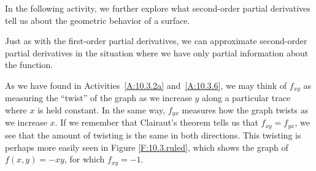 In the following activity, we further explore what second-order partial derivatives tell us about the geometric behavior of a surface.





Just as with the first-order partial derivatives, we can
approximate second-order partial derivatives in the situation where we have only
partial information about the function.



As we have found in Activities~\ref{A:10.3.2a} and~\ref{A:10.3.6}, we may think of $f_{xy}$ as measuring the
``twist'' of the graph as we increase $y$ along a particular trace where $x$ is held constant.  In the same way, $f_{yx}$ measures how
the graph twists as we increase $x$.  If we remember that Clairaut's
theorem tells us that $f_{xy} = f_{yx}$, we see that the amount of
twisting is the same in both directions.  This twisting is perhaps
more easily seen in Figure \ref{F:10.3.ruled}, which shows the graph
of $f(x,y) = -xy$, for which $f_{xy} = -1$.

